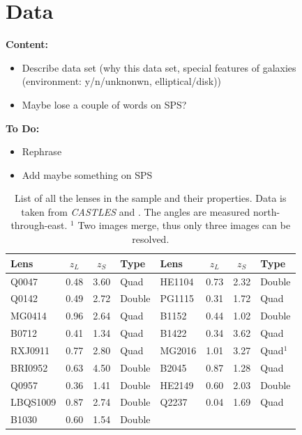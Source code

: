 \documentclass[useAMS,usenatbib]{mn2e}
\begin{document}
\section{Data}\label{sec:data}
\textbf{Content:}
\begin{itemize}
\item Describe data set (why this data set, special features of galaxies (environment: y/n/unknonwn, elliptical/disk))
\item Maybe lose a couple of words on SPS?
\end{itemize}

\textbf{To Do:}
\begin{itemize}
\item Rephrase
\item Add maybe something on SPS
\end{itemize}



\begin{table}
 \begin{center}
  \begin{tabular}{l c c l || l c c l}
   Lens & $z_{L}$ & $z_{S}$ & Type & Lens & $z_{L}$ & $z_{S}$ & Type\\ \hline \hline
   Q0047 & 0.48 & 3.60 & Quad & HE1104 & 0.73 & 2.32 & Double\\
   Q0142 & 0.49 & 2.72 & Double & PG1115 & 0.31 & 1.72 & Quad\\
   MG0414 & 0.96 & 2.64 & Quad & B1152 & 0.44 & 1.02 & Double\\
   B0712 & 0.41 & 1.34 & Quad & B1422 & 0.34 & 3.62 & Quad\\
   RXJ0911 & 0.77 & 2.80 & Quad & MG2016 & 1.01 & 3.27 & Quad$^{1}$\\
   BRI0952 & 0.63 & 4.50 & Double & B2045 & 0.87 & 1.28 & Quad\\
   Q0957 & 0.36 & 1.41 & Double & HE2149 & 0.60 & 2.03 & Double\\
   LBQS1009 & 0.87 & 2.74 & Double & Q2237 & 0.04 & 1.69 & Quad\\
   B1030 & 0.60 & 1.54 & Double & & & & \\
  \end{tabular}
  \caption{List of all the lenses in the sample and their properties. Data is taken from \textit{CASTLES} and \cite{leier11phd}. The angles are measured north-through-east. \newline $^{1}$ Two images merge, thus only three images can be resolved.}
  \label{tab:overview}
 \end{center}
\end{table}
\end{document}
